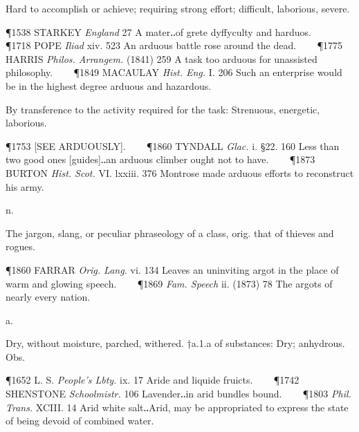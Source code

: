 \begin{description}[wide, labelwidth=!, labelindent=0pt]
\begin{myenumerate}
 Hard to accomplish or achieve; requiring strong effort; difficult, laborious, severe.

\P 1538 STARKEY  \textit{England} 27 A mater‥of grete dyffyculty and harduos.    
\P 1718 POPE  \textit{Iliad} xiv. 523 An arduous battle rose around the dead.    
\P 1775 HARRIS  \textit{Philos. Arrangem.} (1841) 259 A task too arduous for unassisted philosophy.    
\P 1849 MACAULAY  \textit{Hist. Eng.} I. 206 Such an enterprise would be in the highest degree arduous and hazardous.

 By transference to the activity required for the task: Strenuous, energetic, laborious.

\P 1753 [SEE ARDUOUSLY].    
\P 1860 TYNDALL  \textit{Glac.} i. §22. 160 Less than two good ones [guides]‥an arduous climber ought not to have.    
\P 1873 BURTON  \textit{Hist. Scot.} VI. lxxiii. 376 Montrose made arduous efforts to reconstruct his army.
\end{myenumerate}


 n.

\noindent {}


\noindent
The jargon, slang, or peculiar phraseology of a class, orig. that of thieves and rogues.

\P 1860 FARRAR  \textit{Orig. Lang.} vi. 134 Leaves an uninviting argot in the place of warm and glowing speech.    
\P 1869 \textit{Fam. Speech} ii. (1873) 78 The argots of nearly every nation.


 a.

\noindent {}

\vspace{-0.3cm}

\begin{myenumerate}

 Dry, without moisture, parched, withered. †a.1.a of substances: Dry; anhydrous. Obs.

\P 1652 L. S. \textit{People's Lbty.} ix. 17 Aride and liquide fruicts.    
\P 1742 SHENSTONE  \textit{Schoolmistr.} 106 Lavender‥in arid bundles bound.    
\P 1803 \textit{Phil. Trans.} XCIII. 14 Arid white salt‥Arid, may be appropriated to express the state of being devoid of combined water.


\end{myenumerate}
\end{description}
